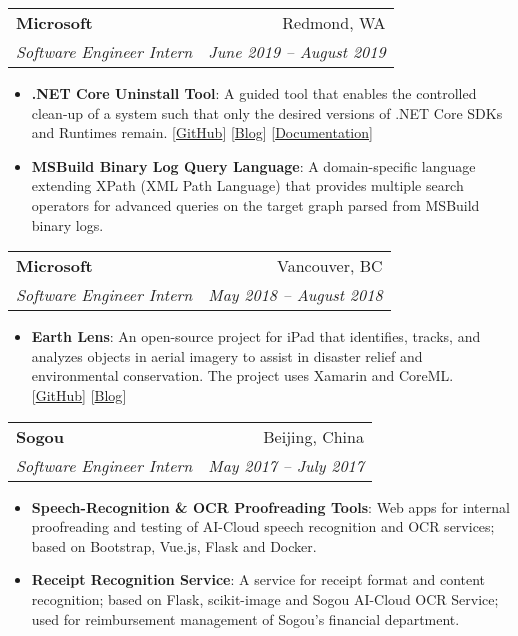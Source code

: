 \documentclass[letterpaper,11pt]{article}
\makeatletter
\newcommand{\resumeItem}[2]{
  \item\small{
    \textbf{#1}{: #2 \vspace{-2pt}}
  }
}
\newcommand{\resumeSubheading}[4]{
  \vspace{-1pt}\item
    \begin{tabular*}{0.97\textwidth}{l@{\extracolsep{\fill}}r}
      \textbf{#1} & #2 \\
      \textit{\small#3} & \textit{\small #4} \\
    \end{tabular*}\vspace{-5pt}
}
\newcommand{\resumeItemListStart}{\begin{itemize}}
\newcommand{\resumeItemListEnd}{\end{itemize}\vspace{-5pt}}
\makeatother
\begin{document}
    \resumeSubheading
      {Microsoft}{Redmond, WA}
      {Software Engineer Intern}{June 2019 -- August 2019}
      \resumeItemListStart
        \resumeItem{.NET Core Uninstall Tool}
          {A guided tool that enables the controlled clean-up of a system such that only the desired versions of .NET Core SDKs and Runtimes remain. [\href{https://github.com/dotnet/cli-lab}{GitHub}] [\href{https://devblogs.microsoft.com/dotnet/announcing-the-net-core-uninstall-tool-1-0/}{Blog}] [\href{https://docs.microsoft.com/dotnet/core/additional-tools/uninstall-tool}{Documentation}]}
        \resumeItem{MSBuild Binary Log Query Language}
          {A domain-specific language extending XPath (XML Path Language) that provides multiple search operators for advanced queries on the target graph parsed from MSBuild binary logs.}
      \resumeItemListEnd

    \resumeSubheading
      {Microsoft}{Vancouver, BC}
      {Software Engineer Intern}{May 2018 -- August 2018}
      \resumeItemListStart
        \resumeItem{Earth Lens}
          {An open-source project for iPad that identifies, tracks, and analyzes objects in aerial imagery to assist in disaster relief and environmental conservation. The project uses Xamarin and CoreML. [\href{https://github.com/microsoft/Earth-Lens}{GitHub}] [\href{https://www.microsoft.com/en-us/garage/blog/2018/10/new-garage-project-earth-lens-pairs-ai-with-aerial-imagery/}{Blog}]}
      \resumeItemListEnd

    \resumeSubheading
      {Sogou}{Beijing, China}
      {Software Engineer Intern}{May 2017 -- July 2017}
      \resumeItemListStart
        \resumeItem{Speech-Recognition \& OCR Proofreading Tools}
          {Web apps for internal proofreading and testing of AI-Cloud speech recognition and OCR services; based on Bootstrap, Vue.js, Flask and Docker.}
        \resumeItem{Receipt Recognition Service}
          {A service for receipt format and content recognition; based on Flask, scikit-image and Sogou AI-Cloud OCR Service; used for reimbursement management of Sogou's financial department.}
      \resumeItemListEnd

\end{document}
